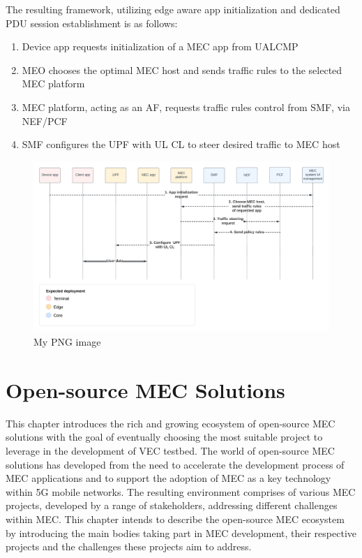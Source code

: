 \documentclass[12pt,a4paper,twoside]{report}
\begin{document}
The resulting framework, utilizing edge aware app initialization and dedicated PDU session establishment is as follows: 
\begin{enumerate}
	\item Device app requests initialization of a MEC app from UALCMP
	\item MEO chooses the optimal MEC host and sends traffic rules to the selected MEC platform
	\item MEC platform, acting as an AF, requests traffic rules control from SMF, via NEF/PCF 
	\item SMF configures the UPF with UL CL to steer desired traffic to MEC host
\end{enumerate}

\begin{figure}[ht]
	\centering
	\includegraphics[width=\textwidth]{./images/MEC-5G-integration-flowchart.png}
	\caption{My PNG image}
\end{figure}

\chapter{Open-source MEC Solutions}
This chapter introduces the rich and growing ecosystem of open-source MEC solutions with the goal of eventually choosing the most suitable project to leverage in the development of VEC testbed. The world of open-source MEC solutions has developed from the need to accelerate the development process of MEC applications and to support the adoption of MEC as a key technology within 5G mobile networks. The resulting environment comprises of various MEC projects, developed by a range of stakeholders, addressing different challenges within MEC. This chapter intends to describe the open-source MEC ecosystem by introducing the main bodies taking part in MEC development, their respective projects and the challenges these projects aim to address. 
\end{document}
